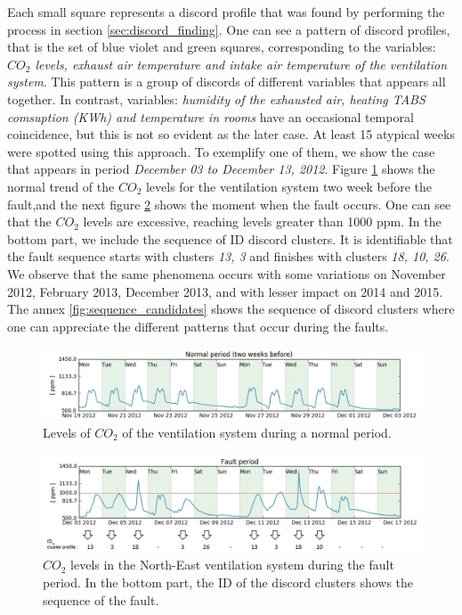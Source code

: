 Each small square represents a discord profile that was found by performing the process in section \ref{sec:discord_finding}. One can see a pattern of discord profiles, that is the set of blue violet and green squares, corresponding to the variables: \textit{$CO_2$ levels, exhaust air temperature and intake air temperature of the ventilation system}. This pattern is a group of discords of different variables that appears all together. In contrast, variables: \textit{humidity of the exhausted air, heating TABS comsuption (KWh) and temperature in rooms} have an occasional temporal coincidence, but this is not so evident as the later case. At least 15 atypical weeks were spotted using this approach. To exemplify one of them, we show the case that appears in period \textit{December 03 to December 13, 2012}. Figure \ref{fig:normal_period} shows the normal trend of the $CO_2$ levels for the ventilation system two week before the fault,and the next figure \ref{fig:fault_period} shows the moment when the fault occurs. One can see that the $CO_2$ levels are excessive, reaching levels greater than 1000 ppm. In the bottom part, we include the sequence of ID discord clusters. It is identifiable that the fault sequence starts with clusters \textit{13, 3} and finishes with clusters \textit{18, 10, 26}. We observe that the same phenomena occurs with some variations on November 2012, February 2013, December 2013, and with lesser impact on 2014 and 2015. The annex \ref{fig:sequence_candidates} shows the sequence of discord clusters where one can appreciate the different patterns that occur during the faults. 
    
\begin{figure}[h!]
  \vspace{0.5em} %
  \includegraphics[scale=0.6]{Figures/case_study_trend_1_normal.jpg}
  \caption{Levels of $CO_2$ of the ventilation system during a normal period.}
  \label{fig:normal_period}
\end{figure}

\begin{figure}[h!]
  \vspace{0.5em} %
  \includegraphics[scale=0.6]{Figures/case_study_trend_1_fault.jpg}
  \caption{$CO_2$ levels in the North-East ventilation system during the fault period. In the bottom part, the ID of the discord clusters shows the sequence of the fault.}
  \label{fig:fault_period}
\end{figure}

